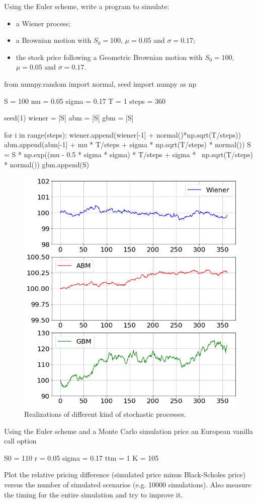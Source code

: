 \begin{question}
Using the Euler scheme, write a program to simulate:
\begin{itemize}
\tightlist
\item a Wiener process;
\item a Brownian motion with $S_0 = 100$, $\mu=0.05$ and $\sigma=0.17$;
\item the stock price following a Geometric Brownian motion with $S_0 = 100$, $\mu=0.05$ and $\sigma=0.17$.
\end{itemize}
\end{question}

\cprotEnv\begin{solution}
\begin{ipython}
from numpy.random import normal, seed
import numpy as np

S = 100
mu = 0.05
sigma = 0.17
T = 1
steps = 360

seed(1)
wiener = [S]
abm = [S]
gbm = [S]

for i in range(steps):
    wiener.append(wiener[-1] + normal()*np.sqrt(T/steps))
    abm.append(abm[-1] + mu * T/steps + sigma * np.sqrt(T/steps) * normal())
    S = S * np.exp((mu - 0.5 * sigma * sigma) * T/steps + sigma * \
                    np.sqrt(T/steps) * normal())
    gbm.append(S)
\end{ipython}

\begin{figure}[htbp]
\centering
\includegraphics[width=0.5\linewidth]{figures/ex_stochastic}
\caption{Realizations of different kind of stochastic processes.}
\end{figure}
\end{solution}

\cprotEnv\begin{question}
Using the Euler scheme and a Monte Carlo simulation price an European vanilla call option

\begin{ipython}
S0 = 110
r = 0.05
sigma = 0.17
ttm = 1
K = 105
\end{ipython}

Plot the relative pricing difference (simulated price minus Black-Scholes price) versus the number of simulated scenarios (e.g. 10000 simulations).
Also measure the timing for the entire simulation and try to improve it.
\end{question}

